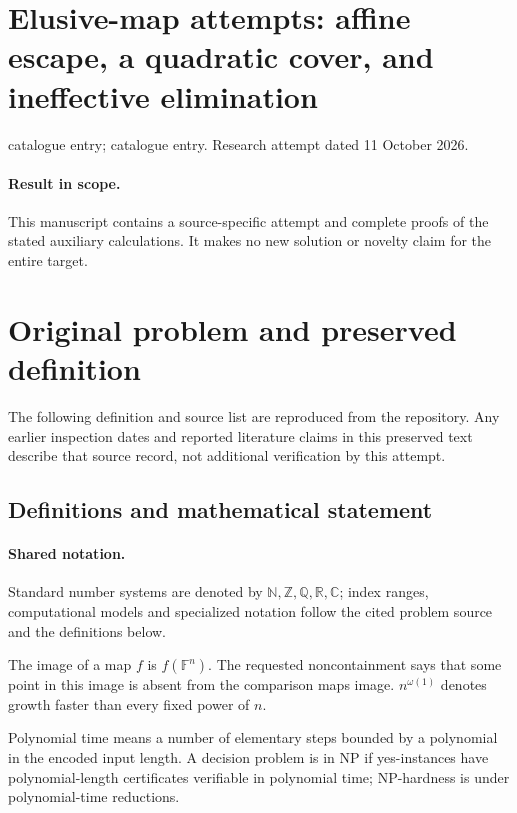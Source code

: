 \documentclass[11pt]{article}
\begin{document}
\section*{Elusive-map attempts: affine escape, a quadratic cover, and ineffective elimination}
\noindent catalogue entry; catalogue entry. Research attempt dated 11 October 2026.
\paragraph{Result in scope.}This manuscript contains a source-specific attempt and complete proofs of the stated auxiliary calculations. It makes no new solution or novelty claim for the entire target.
\section{Original problem and preserved definition}
The following definition and source list are reproduced from the repository. Any earlier inspection dates and reported literature claims in this preserved text describe that source record, not additional verification by this attempt.
\subsection{Definitions and mathematical statement}

\paragraph{Shared notation.}Standard number systems are denoted by $\mathbb N,\mathbb Z,\mathbb Q,\mathbb R,\mathbb C$; index ranges, computational models and specialized notation follow the cited problem source and the definitions below.


The image of a map $f$ is $f(\mathbb F^n)$. The requested noncontainment says that some point in this image is absent from the comparison map\textquotesingle s image. $n^{\omega(1)}$ denotes growth faster than every fixed power of $n$.

Polynomial time means a number of elementary steps bounded by a polynomial in the encoded input length. A decision problem is in $\mathrm{NP}$ if yes-instances have polynomial-length certificates verifiable in polynomial time; NP-hardness is under polynomial-time reductions.
\end{document}

